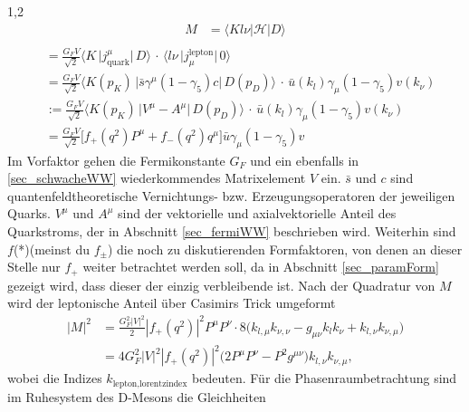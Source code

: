 \documentclass[11pt,a4paper,twoside,draft]{report}
\begin{document}
\begin{spacing}{1,2}
\begin{align*}
 M &= \big\langle Kl\nu|\mathcal{H}|D\big\rangle\nonumber\\
 \end{align*}
 \begin{align}
 &= \frac{G_F V}{\sqrt{2}}\big\langle K\, \big|j_\text{quark}^\mu\big|\,D \big\rangle \,\cdot\,\big\langle l\nu\,\big|j_\mu^\text{lepton}\big|\,0\big\rangle\nonumber\\
 &= \frac{G_F V}{\sqrt{2}}\big\langle K(p_K)\, \big|\bar s \gamma^\mu(1-\gamma_5) c \big|\,D(p_D) \big\rangle \, \cdot \,\bar u(k_l) \gamma_\mu(1-\gamma_5)v(k_\nu)\nonumber\\
 &:= \frac{G_F V}{\sqrt{2}}\big\langle K(p_K)\, \big|V^\mu - A^\mu\big|\,D(p_D) \big\rangle \, \cdot \,\bar u(k_l) \gamma_\mu(1-\gamma_5)v(k_\nu)\nonumber\\
 &=\frac{G_F V}{\sqrt{2}} \big[f_+(q^2) P^\mu  + f_-(q^2) q^\mu\big] \bar u \gamma_\mu(1-\gamma_5)v
 \label{eq_fermiMG_F}
 \end{align}
Im Vorfaktor gehen die Fermikonstante $G_F$ und ein ebenfalls in \ref{sec_schwacheWW} wiederkommendes Matrixelement $V$ ein. $\bar s$ und $c$ sind quantenfeldtheoretische 
Vernichtungs- bzw. Erzeugungsoperatoren der jeweiligen Quarks. $V^\mu$ und $A^\mu$ sind der vektorielle und axialvektorielle Anteil des Quarkstroms, der 
in Abschnitt \ref{sec_fermiWW} beschrieben wird. Weiterhin sind $f$(*)(meinst du $f_\pm$) die noch zu
diskutierenden Formfaktoren, von denen an dieser Stelle nur $f_+$ weiter betrachtet werden soll, da in Abschnitt \ref{sec_paramForm} gezeigt wird, dass dieser
der einzig verbleibende ist. Nach der Quadratur von $M$ wird der leptonische Anteil über 
Casimirs Trick \cite{Griffiths} umgeformt
\begin{align}
 \big|M\big|^2 &= \frac{G_F^2|V|^2}{2}|f_+(q^2)|^2 P^\mu P^\nu \cdot 8\big(k_{l,\mu} k_{\nu,\nu} - g_{\mu\nu}k_lk_\nu + k_{l,\nu}k_{\nu,\mu}\big)\nonumber\\
 &=4G_F^2|V|^2 |f_+(q^2)|^2 \big(2P^\mu P^\nu - P^2 g^{\mu\nu}\big) k_{l,\nu}k_{\nu,\mu},
 \label{eq_fermiMelement}
\end{align}
wobei die Indizes $k_{\text{lepton},\text{lorentzindex}}$ bedeuten. Für die Phasenraumbetrachtung sind im Ruhesystem des D-Mesons die Gleichheiten

\end{spacing}
\end{document}
